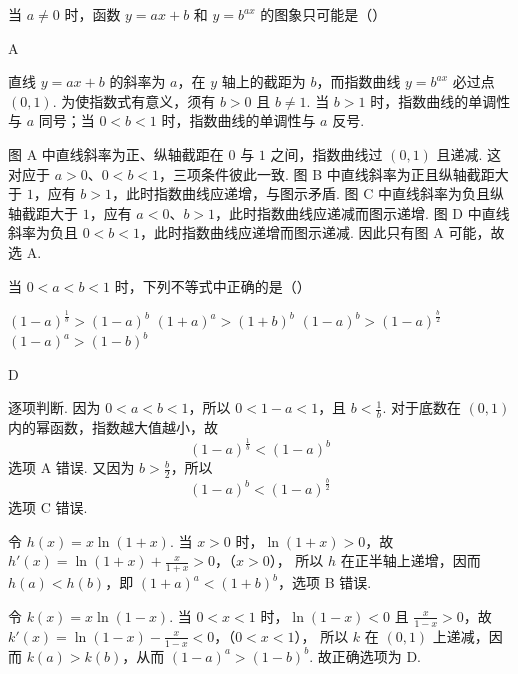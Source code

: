 \begin{problem}
当 \(a\neq 0\) 时，函数 \(y=ax+b\) 和 \(y=b^{ax}\) 的图象只可能是（\quad）

    {}
    {}
    {}
\end{problem}

\begin{answer}
A
\end{answer}

\begin{solution}
直线 \(y=ax+b\) 的斜率为 \(a\)，在 \(y\) 轴上的截距为 \(b\)，而指数曲线 \(y=b^{ax}\) 必过点 \((0,1)\). 为使指数式有意义，须有 \(b>0\) 且 \(b\ne1\). 当 \(b>1\) 时，指数曲线的单调性与 \(a\) 同号；当 \(0<b<1\) 时，指数曲线的单调性与 \(a\) 反号.

图 A 中直线斜率为正、纵轴截距在 \(0\) 与 \(1\) 之间，指数曲线过 \((0,1)\) 且递减. 这对应于 \(a>0\)、\(0<b<1\)，三项条件彼此一致. 图 B 中直线斜率为正且纵轴截距大于 \(1\)，应有 \(b>1\)，此时指数曲线应递增，与图示矛盾. 图 C 中直线斜率为负且纵轴截距大于 \(1\)，应有 \(a<0\)、\(b>1\)，此时指数曲线应递减而图示递增. 图 D 中直线斜率为负且 \(0<b<1\)，此时指数曲线应递增而图示递减. 因此只有图 A 可能，故选 A.
\end{solution}

\begin{problem}
当 \(0<a<b<1\) 时，下列不等式中正确的是（\quad）

\choices
    {\((1-a)^{\frac{1}{b}}>(1-a)^b\)}
    {\((1+a)^a>(1+b)^b\)}
    {\((1-a)^b>(1-a)^{\frac{b}{2}}\)}
    {\((1-a)^a>(1-b)^b\)}
\end{problem}

\begin{answer}
D
\end{answer}

\begin{solution}
逐项判断. 因为 \(0<a<b<1\)，所以 \(0<1-a<1\)，且 \(b<\frac{1}{b}\). 对于底数在 \((0,1)\) 内的幂函数，指数越大值越小，故
\[
(1-a)^{\frac{1}{b}}<(1-a)^b
\]
选项 A 错误. 又因为 \(b>\frac b2\)，所以
\[
(1-a)^b<(1-a)^{\frac{b}{2}}
\]
选项 C 错误.

令 \(h(x)=x\ln(1+x)\). 当 \(x>0\) 时，\(\ln(1+x)>0\)，故
\(h'(x)=\ln(1+x)+\frac{x}{1+x}>0\)，（\(x>0\)），
所以 \(h\) 在正半轴上递增，因而 \(h(a)<h(b)\)，即 \((1+a)^a<(1+b)^b\)，选项 B 错误.

令 \(k(x)=x\ln(1-x)\). 当 \(0<x<1\) 时，\(\ln(1-x)<0\) 且 \(\frac{x}{1-x}>0\)，故
\(k'(x)=\ln(1-x)-\frac{x}{1-x}<0\)，（\(0<x<1\)），
所以 \(k\) 在 \((0,1)\) 上递减，因而 \(k(a)>k(b)\)，从而 \((1-a)^a>(1-b)^b\). 故正确选项为 D.
\end{solution}

